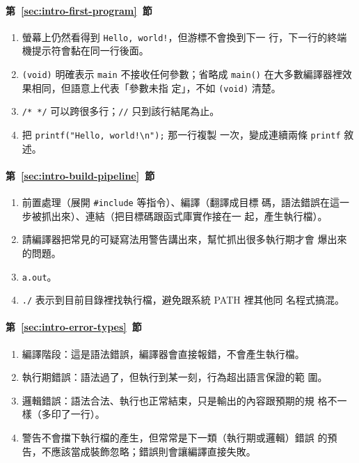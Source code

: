 \paragraph{第~\ref{sec:intro-first-program}~節}
\begin{enumerate}
\item 螢幕上仍然看得到 \texttt{Hello, world!}，但游標不會換到下一
行，下一行的終端機提示符會黏在同一行後面。
\item \texttt{(void)} 明確表示 \texttt{main} 不接收任何參數；省略成
\texttt{main()} 在大多數編譯器裡效果相同，但語意上代表「參數未指
定」，不如 \texttt{(void)} 清楚。
\item \texttt{/* */} 可以跨很多行；\texttt{//} 只到該行結尾為止。
\item 把 \texttt{printf("Hello, world!\textbackslash n");} 那一行複製
一次，變成連續兩條 \texttt{printf} 敘述。
\end{enumerate}

\paragraph{第~\ref{sec:intro-build-pipeline}~節}
\begin{enumerate}
\item 前置處理（展開 \texttt{\#include} 等指令）、編譯（翻譯成目標
碼，語法錯誤在這一步被抓出來）、連結（把目標碼跟函式庫實作接在一
起，產生執行檔）。
\item 請編譯器把常見的可疑寫法用警告講出來，幫忙抓出很多執行期才會
爆出來的問題。
\item \texttt{a.out}。
\item \texttt{./} 表示到目前目錄裡找執行檔，避免跟系統 PATH 裡其他同
名程式搞混。
\end{enumerate}

\paragraph{第~\ref{sec:intro-error-types}~節}
\begin{enumerate}
\item 編譯階段：這是語法錯誤，編譯器會直接報錯，不會產生執行檔。
\item 執行期錯誤：語法過了，但執行到某一刻，行為超出語言保證的範
圍。
\item 邏輯錯誤：語法合法、執行也正常結束，只是輸出的內容跟預期的規
格不一樣（多印了一行）。
\item 警告不會擋下執行檔的產生，但常常是下一類（執行期或邏輯）錯誤
的預告，不應該當成裝飾忽略；錯誤則會讓編譯直接失敗。
\end{enumerate}
